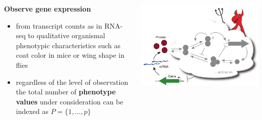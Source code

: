 \begin{frame}
\begin{columns}[c]
\begin{column}{0.5\textwidth}
\begin{block}{\textbf{Observe gene expression}}
\begin{itemize}
\item from transcript counts as in RNA-seq to qualitative organismal phenotypic characteristics such as coat color in mice or wing shape in flies
\item regardless of the level of observation the total number of \textbf{phenotype values} under consideration can be indexed as $P = \{ 1, \ldots, p \} $
\end{itemize}
\end{block}
\end{column}
\begin{column}{0.5\textwidth}
\begin{center}
\includegraphics[width=1.0\textwidth]{fig/geneexpressiondemon.png}
\end{center}
\end{column}
\end{columns}
\end{frame}
